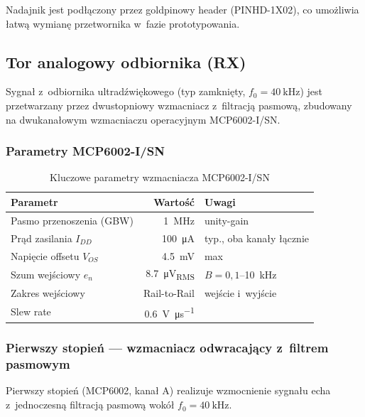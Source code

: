 \documentclass[a4paper,11pt]{article}
\begin{document}
Nadajnik jest podłączony przez goldpinowy header (PINHD-1X02), co
umożliwia łatwą wymianę przetwornika w~fazie prototypowania.

\subsection{Tor analogowy odbiornika (RX)}
\label{sec:tor_rx}

Sygnał z~odbiornika ultradźwiękowego (typ zamknięty, $f_0 = \SI{40}{\kilo\hertz}$)
jest przetwarzany przez dwustopniowy wzmacniacz z~filtracją pasmową, zbudowany
na dwukanałowym wzmacniaczu operacyjnym MCP6002-I/SN.

\subsubsection{Parametry MCP6002-I/SN}

\begin{table}[H]
    \centering
    \caption{Kluczowe parametry wzmacniacza MCP6002-I/SN}
    \label{tab:mcp6002}
    \begin{tabular}{lrl}
        \toprule
        \textbf{Parametr} & \textbf{Wartość} & \textbf{Uwagi} \\
        \midrule
        Pasmo przenoszenia (GBW) & \SI{1}{\mega\hertz} & unity-gain \\
        Prąd zasilania $I_{DD}$ & \SI{100}{\micro\ampere} & typ., oba kanały łącznie \\
        Napięcie offsetu $V_{OS}$ & \SI{4,5}{\milli\volt} & max \\
        Szum wejściowy $e_n$ & \SI{8,7}{\micro\volt_{RMS}} & $B = 0{,}1$--\SI{10}{\kilo\hertz} \\
        Zakres wejściowy & Rail-to-Rail & wejście i~wyjście \\
        Slew rate & \SI{0,6}{\volt\per\micro\second} & \\
        \bottomrule
    \end{tabular}
\end{table}

\subsubsection{Pierwszy stopień --- wzmacniacz odwracający z~filtrem pasmowym}

Pierwszy stopień (MCP6002, kanał A) realizuje wzmocnienie sygnału echa
z~jednoczesną filtracją pasmową wokół $f_0 = \SI{40}{\kilo\hertz}$.
\end{document}
